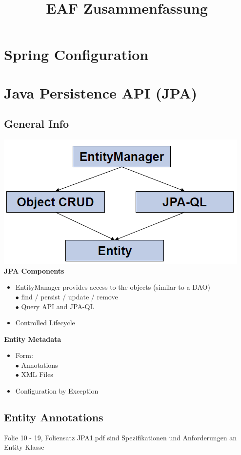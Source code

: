 \documentclass[10pt]{scrartcl}
\title{ %
EAF Zusammenfassung}
\newcommand{\Bold}[1]{\textbf{#1}} %
\begin{document}
 \maketitle
 \thispagestyle{firststyle}
 \pagestyle{firststyle}
 

 \pagestyle{documentstyle}
 \tableofcontents
 \pagebreak
\section{Spring Configuration}
\section{Java Persistence API (JPA)}
\subsection{General Info}
\includegraphics[scale=0.5]{jpa.png}
\Bold{JPA Components}
\begin{itemize}
\item EntityManager provides access to the objects (similar to a DAO)\\
$\bullet$ find / persist / update / remove\\
$\bullet$ Query API and JPA-QL
\item Controlled Lifecycle
\end{itemize}
\Bold{Entity Metadata}
\begin{itemize}
\item Form:\\
$\bullet$ Annotations\\
$\bullet$ XML Files
\item Configuration by Exception
\end{itemize}
\subsection{Entity Annotations}

Folie 10 - 19, Foliensatz JPA1.pdf sind Spezifikationen und Anforderungen an Entity Klasse
\end{document}
